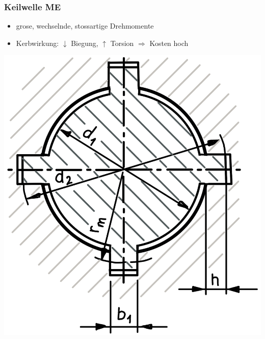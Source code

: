 \subsubsection{Keilwelle \hfill ME}
    \begin{scriptsize}
        \begin{itemize}
            \item grose, wechselnde, stossartige Drehmomente
            \item Kerbwirkung: $\downarrow$ Biegung, $\uparrow$ Torsion $\Rightarrow$ Kosten hoch
        \end{itemize}
    \end{scriptsize}
    \begin{minipage}{0.38\linewidth}
        \begin{center}
            \includegraphics[width = 1.0\linewidth]{MAEIP_Keilwelle}
        \end{center}
    \end{minipage}

